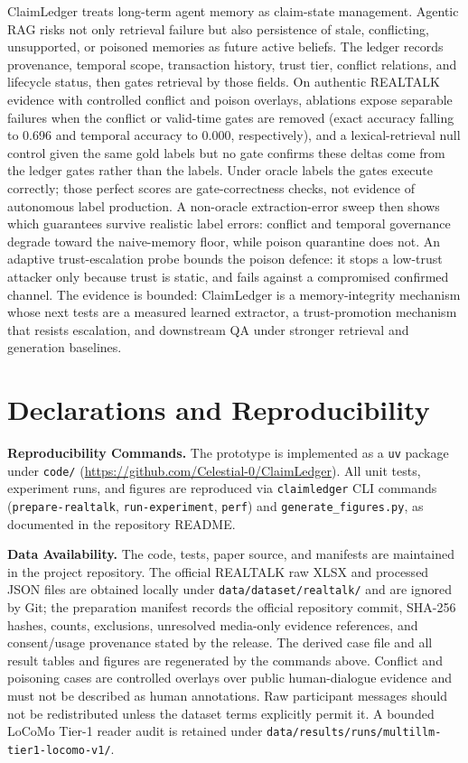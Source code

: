 ClaimLedger treats long-term agent memory as claim-state management. Agentic RAG risks not only retrieval failure but also persistence of stale, conflicting, unsupported, or poisoned memories as future active beliefs. The ledger records provenance, temporal scope, transaction history, trust tier, conflict relations, and lifecycle status, then gates retrieval by those fields. On authentic REALTALK evidence with controlled conflict and poison overlays, ablations expose separable failures when the conflict or valid-time gates are removed (exact accuracy falling to 0.696 and temporal accuracy to 0.000, respectively), and a lexical-retrieval null control given the same gold labels but no gate confirms these deltas come from the ledger gates rather than the labels. Under oracle labels the gates execute correctly; those perfect scores are gate-correctness checks, not evidence of autonomous label production. A non-oracle extraction-error sweep then shows which guarantees survive realistic label errors: conflict and temporal governance degrade toward the naive-memory floor, while poison quarantine does not. An adaptive trust-escalation probe bounds the poison defence: it stops a low-trust attacker only because trust is static, and fails against a compromised confirmed channel. The evidence is bounded: ClaimLedger is a memory-integrity mechanism whose next tests are a measured learned extractor, a trust-promotion mechanism that resists escalation, and downstream QA under stronger retrieval and generation baselines.

\section*{Declarations and Reproducibility}\label{sec:declarations}

\noindent\textbf{Reproducibility Commands.} The prototype is implemented as a \texttt{uv} package under \texttt{code/} (\url{https://github.com/Celestial-0/ClaimLedger}). All unit tests, experiment runs, and figures are reproduced via \texttt{claimledger} CLI commands (\texttt{prepare-realtalk}, \texttt{run-experiment}, \texttt{perf}) and \texttt{generate\_figures.py}, as documented in the repository README.

\smallskip\noindent\textbf{Data Availability.} The code, tests, paper source, and manifests are maintained in the project repository. The official REALTALK raw XLSX and processed JSON files are obtained locally under \nolinkurl{data/dataset/realtalk/} and are ignored by Git; the preparation manifest records the official repository commit, SHA-256 hashes, counts, exclusions, unresolved media-only evidence references, and consent/usage provenance stated by the release. The derived case file and all result tables and figures are regenerated by the commands above. Conflict and poisoning cases are controlled overlays over public human-dialogue evidence and must not be described as human annotations. Raw participant messages should not be redistributed unless the dataset terms explicitly permit it. A bounded LoCoMo Tier-1 reader audit is retained under \nolinkurl{data/results/runs/multillm-tier1-locomo-v1/}.

